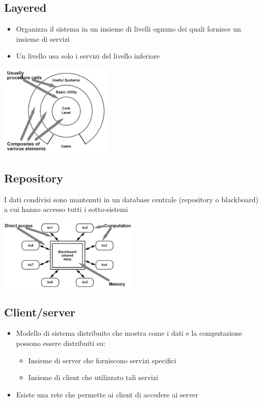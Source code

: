 \documentclass[12pt, a4paper]{report}
\begin{document}
\subsection{Layered}
\begin{itemize}
    \item Organizza il sistema in un insieme di livelli ognuno dei quali fornisce un insieme di servizi
    \item Un livello usa solo i servizi del livello inferiore
\end{itemize}
\begin{center}
    \includegraphics[width=0.4\textwidth]{Immagini/layered.png}
\end{center}
\subsection{Repository}
I dati condivisi sono mantenuti in un database centrale (repository o blackboard) a cui hanno accesso tutti i sotto-sistemi
\begin{center}
    \includegraphics[width=0.5\textwidth]{Immagini/repository.png}
\end{center}
\subsection{Client/server}
\begin{itemize}
    \item Modello di sistema distribuito che mostra come i dati e la computazione possono essere distribuiti su: \begin{itemize}
        \item Insieme di server che forniscono servizi specifici
        \item Insieme di client che utilizzato tali servizi
    \end{itemize}
    \item Esiste una rete che permette ai client di accedere ai server
\end{itemize}
\end{document}

